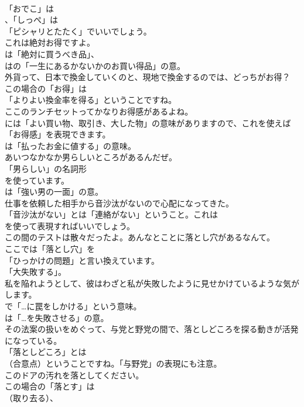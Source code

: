 \documentclass[8pt]{extreport}
\begin{document}
\begin{CJK}{UTF8}{min}
\\	「おでこ」は
\\	、「しっぺ」は
\\	「ピシャリとたたく」でいいでしょう。	
\\	これは絶対お得ですよ。 
\\	は「絶対に買うべき品」、
\\	はの「一生にあるかないかのお買い得品」の意。	
\\	外貨って、日本で換金していくのと、現地で換金するのでは、どっちがお得？ 
\\	この場合の「お得」は
\\	「よりよい換金率を得る」ということですね。	
\\	ここのランチセットってかなりお得感があるよね。 
\\	には「よい買い物、取引き、大した物」の意味がありますので、これを使えば「お得感」を表現できます。
\\	は「払ったお金に値する」の意味。	
\\	あいつなかなか男らしいところがあるんだぜ。 
\\	「男らしい」の名詞形
\\	を使っています。
\\	は「強い男の一面」の意。	
\\	仕事を依頼した相手から音沙汰がないので心配になってきた。 
\\	「音沙汰がない」とは「連絡がない」ということ。これは
\\	を使って表現すればいいでしょう。	
\\	この間のテストは散々だったよ。あんなとことに落とし穴があるなんて。 
\\	ここでは「落とし穴」を
\\	「ひっかけの問題」と言い換えています。
\\	「大失敗する」。	
\\	私を陥れようとして、彼はわざと私が失敗したように見せかけているような気がします。 
\\	で「…に罠をしかける」という意味。
\\	は「…を失敗させる」の意。	
\\	その法案の扱いをめぐって、与党と野党の間で、落としどころを探る動きが活発になっている。 
\\	「落としどころ」とは
\\	（合意点）ということですね。「与野党」の表現にも注意。	
\\	このドアの汚れを落としてください。 
\\	この場合の「落とす」は
\\	（取り去る）、

\end{CJK}
\end{document}
